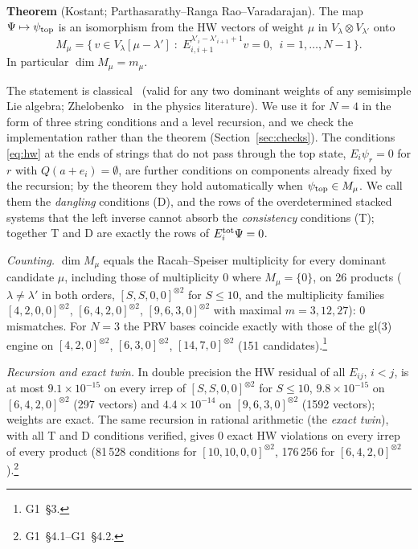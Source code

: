 \documentclass[11pt]{article}
\makeatletter
\renewcommand\subsection{\@startsection{subsection}{2}{\z@}{-2.0ex \@plus -1ex \@minus -.2ex}{0.6ex \@plus .2ex}{\normalfont\normalsize\bfseries}}
\newcommand{\rg}[2]{\textsf{G#1}~\S#2}
\makeatother
\begin{document}
\textbf{Theorem} (Kostant; Parthasarathy--Ranga Rao--Varadarajan).
The map $\Psi\mapsto\psi_{\rm top}$ is an isomorphism from the HW vectors of weight $\mu$ in $V_\lambda\otimes V_{\lambda'}$ onto
\begin{equation}\label{eq:M}
M_\mu=\{\,v\in V_\lambda[\mu-\lambda']\;:\;E_{i,i+1}^{\lambda'_i-\lambda'_{i+1}+1}v=0,\ \ i=1,\dots,N-1\,\}.
\end{equation}
In particular $\dim M_\mu=m_\mu$.

The statement is classical~\cite{kostant,prv,kumar} (valid for any two dominant weights of any semisimple Lie algebra; Zhelobenko~\cite{zhel} in the physics literature).
We use it for $N=4$ in the form of three string conditions and a level recursion, and we check the implementation rather than the theorem (Section~\ref{sec:checks}).
The conditions \eqref{eq:hw} at the ends of strings that do not pass through the top state, $E_i\psi_r=0$ for $r$ with $Q(a+e_i)=\emptyset$, are further conditions on components already fixed by the recursion; by the theorem they hold automatically when $\psi_{\rm top}\in M_\mu$.
We call them the \emph{dangling} conditions (D), and the rows of the overdetermined stacked systems that the left inverse cannot absorb the \emph{consistency} conditions (T); together T and D are exactly the rows of $E_i^{\rm tot}\Psi=0$.

\subsection{Checks of the implementation}\label{sec:checks}

\emph{Counting.}
$\dim M_\mu$ equals the Racah--Speiser multiplicity for every dominant candidate $\mu$, including those of multiplicity $0$ where $M_\mu=\{0\}$, on 26 products ($\lambda\ne\lambda'$ in both orders, $[S,S,0,0]^{\otimes2}$ for $S\le10$, and the multiplicity families $[4,2,0,0]^{\otimes2}$, $[6,4,2,0]^{\otimes2}$, $[9,6,3,0]^{\otimes2}$ with maximal $m=3,12,27$): 0 mismatches.
For $N=3$ the PRV bases coincide exactly with those of the gl(3) engine on $[4,2,0]^{\otimes2}$, $[6,3,0]^{\otimes2}$, $[14,7,0]^{\otimes2}$ (151 candidates).\footnote{\rg{1}{3}.}

\emph{Recursion and exact twin.}
In double precision the HW residual of all $E_{ij}$, $i<j$, is at most $9.1\times10^{-15}$ on every irrep of $[S,S,0,0]^{\otimes2}$ for $S\le10$, $9.8\times10^{-15}$ on $[6,4,2,0]^{\otimes2}$ (297 vectors) and $4.4\times10^{-14}$ on $[9,6,3,0]^{\otimes2}$ (1592 vectors); weights are exact.
The same recursion in rational arithmetic (the \emph{exact twin}), with all T and D conditions verified, gives 0 exact HW violations on every irrep of every product (81\,528 conditions for $[10,10,0,0]^{\otimes2}$, 176\,256 for $[6,4,2,0]^{\otimes2}$).\footnote{\rg{1}{4.1}--\rg{1}{4.2}.}
\end{document}
